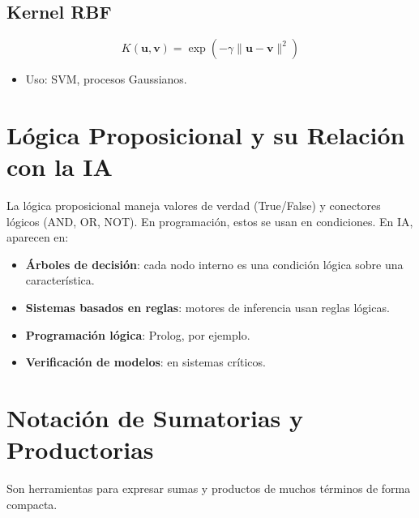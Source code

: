 \documentclass[12pt,a4paper,openany,oneside]{book}
\begin{document}
\subsection{Kernel RBF}
\begin{equation*}
K(\mathbf{u},\mathbf{v}) = \exp\left(-\gamma \|\mathbf{u}-\mathbf{v}\|^2\right)
\end{equation*}
\begin{itemize}
    \item Uso: SVM, procesos Gaussianos.
\end{itemize}

\section{Lógica Proposicional y su Relación con la IA}
La lógica proposicional maneja valores de verdad (True/False) y conectores lógicos (AND, OR, NOT). En programación, estos se usan en condiciones. En IA, aparecen en:

\begin{itemize}
    \item \textbf{Árboles de decisión}: cada nodo interno es una condición lógica sobre una característica.
    \begin{center}
    \end{center}
    \item \textbf{Sistemas basados en reglas}: motores de inferencia usan reglas lógicas.
    \item \textbf{Programación lógica}: Prolog, por ejemplo.
    \item \textbf{Verificación de modelos}: en sistemas críticos.
\end{itemize}

\section{Notación de Sumatorias y Productorias}
Son herramientas para expresar sumas y productos de muchos términos de forma compacta.
\end{document}
